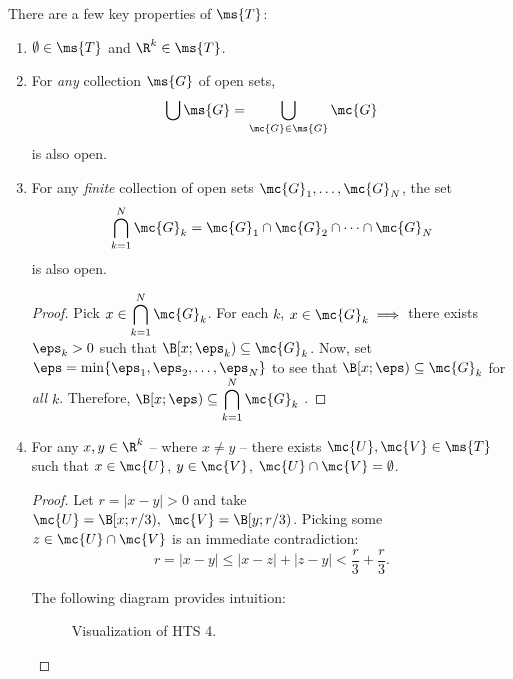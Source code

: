 There are a few key properties of \(\ms{T}\):
\begin{enumerate}[(HTS~1)]
	\item \(\emptyset\in\ms{T}\) and \(\R^k\in\ms{T}\).
	
	\item For \emph{any} collection \(\ms{G}\) of open sets, 
	\begin{equation*}
		\bigcup\ms{G}=\bigcup_{\mc{G}\in\ms{G}}\mc{G}
	\end{equation*}
	is also open.
	
	\item For any \emph{finite} collection of open sets \(\mc{G}_1,\dots,\mc{G}_N\), the set 
	\begin{equation*}
		\bigcap_{k=1}^N \mc{G}_k=\mc{G}_1\cap \mc{G}_2\cap\dots\cap \mc{G}_N
	\end{equation*}
	is also open.
	\begin{proof}
		Pick \(x\in\displaystyle\bigcap_{k=1}^N \mc{G}_k\). For each \(k\), \(x\in \mc{G}_k\implies\) there exists \(\eps_k>0\) such that \(\B[x;\eps_k)\subseteq \mc{G}_k\). Now, set \(\eps=\operatorname{min}\{\eps_1,\eps_2,\dots,\eps_N\}\) to see that \(\B[x;\eps)\subseteq \mc{G}_k\) for \emph{all} \(k\). Therefore, \(\B[x;\eps)\subseteq\displaystyle\bigcap_{k=1}^N \mc{G}_k\) .
	\end{proof}
	
	\item For any \(x,y\in\R^k\) -- where \(x\neq y\) -- there exists \(\mc{U},\mc{V}\in\ms{T}\) such that \(x\in\mc{U}\), \(y\in\mc{V}\), \(\mc{U}\cap\mc{V}=\emptyset\).
	\begin{proof}
		Let \(r=|x-y|>0\) and take \(\mc{U}=\B[x;r/3),~\mc{V}=\B[y;r/3)\). Picking some \(z\in\mc{U}\cap\mc{V}\) is an immediate contradiction:
		\begin{equation*}
			r=|x-y|\leq |x-z|+|z-y|<\frac{r}{3}+\frac{r}{3}.
		\end{equation*}
		
		The following diagram provides intuition:
		\begin{figure}[H]
			\centering
			\caption{Visualization of HTS 4.}
		\end{figure}
	\end{proof}
\end{enumerate}
